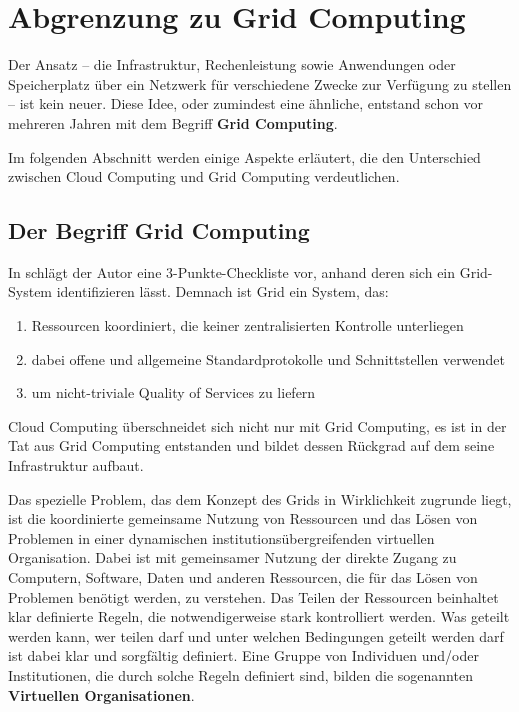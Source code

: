 \section{Abgrenzung zu Grid Computing}
Der Ansatz -- die Infrastruktur, Rechenleistung sowie Anwendungen oder Speicherplatz über ein Netzwerk für verschiedene Zwecke zur Verfügung zu stellen -- ist kein neuer.
Diese Idee, oder zumindest eine ähnliche, entstand schon vor mehreren Jahren mit dem Begriff \textbf{Grid Computing}.

Im folgenden Abschnitt werden einige Aspekte erläutert, die den Unterschied zwischen Cloud Computing und Grid Computing verdeutlichen.
 
\subsection{Der Begriff \glqq Grid Computing\grqq}
In \cite{grid-checklist} schlägt der Autor eine 3-Punkte-Checkliste vor, anhand deren sich ein Grid-System identifizieren lässt. Demnach ist Grid ein System, das:
\begin{enumerate}
  \item Ressourcen koordiniert, die keiner zentralisierten Kontrolle unterliegen
  \item dabei offene und allgemeine Standardprotokolle und Schnittstellen verwendet
  \item um nicht-triviale \glqq Quality of Services\grqq{} zu liefern
\end{enumerate}

Cloud Computing überschneidet sich nicht nur mit Grid Computing, es ist in der Tat aus Grid Computing entstanden und bildet dessen Rückgrad auf dem seine Infrastruktur aufbaut\cite{360-degree-compared}.

Das spezielle Problem, das dem Konzept des Grids in Wirklichkeit zugrunde liegt,
ist die koordinierte gemeinsame Nutzung von Ressourcen und das Lösen von Problemen
in einer dynamischen institutionsübergreifenden virtuellen Organisation.
Dabei ist mit \glqq gemeinsamer Nutzung\grqq{} der direkte Zugang zu Computern, Software, Daten und anderen Ressourcen,
die für das Lösen von Problemen benötigt werden, zu verstehen.
Das Teilen der Ressourcen beinhaltet klar definierte Regeln, die notwendigerweise stark kontrolliert werden.
Was geteilt werden kann, wer teilen darf und unter welchen Bedingungen geteilt werden darf ist dabei klar und sorgfältig definiert.
Eine Gruppe von Individuen und/oder Institutionen, die durch solche Regeln definiert sind,
bilden die sogenannten \textbf{Virtuellen Organisationen}.\cite{anatomy-of-grid}

